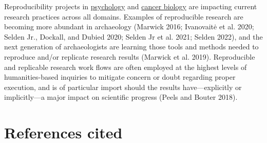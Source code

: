 \documentclass[smallextended]{svjour3}       %
\begin{document}
Reproducibility projects in \href{https://osf.io/ezcuj/}{psychology} and
\href{https://www.cos.io/rpcb}{cancer biology} are impacting current
research practices across all domains. Examples of reproducible research
are becoming more abundant in archaeology (Marwick 2016; Ivanovaitė et
al. 2020; Selden Jr., Dockall, and Dubied 2020; Selden Jr et al. 2021;
Selden 2022), and the next generation of archaeologists are learning
those tools and methods needed to reproduce and/or replicate research
results (Marwick et al. 2019). Reproducible and replicable research work
flows are often employed at the highest levels of humanities-based
inquiries to mitigate concern or doubt regarding proper execution, and
is of particular import should the results have---explicitly or
implicitly---a major impact on scientific progress (Peels and Bouter
2018).

\hypertarget{references-cited}{%
\section*{References cited}\label{references-cited}}
\end{document}
